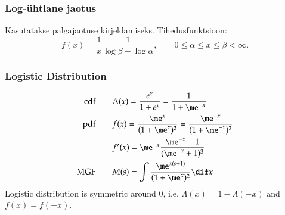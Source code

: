 \documentclass[a4paper]{article}
\numberwithin{equation}{subsection}
\begin{document}
\subsubsection{Log-ühtlane jaotus}
Kasutatakse palgajaotuse kirjeldamiseks.  Tihedusfunktsioon:
\begin{equation}
  f(x) = \frac{1}{x}\frac{1}{\log \beta - \log \alpha}, \qquad
  0 \le \alpha \le x \le \beta < \infty.
\end{equation}

\subsubsection{Logistic Distribution}
\begin{align}
  \text{cdf}\qquad & \Lambda(x) = \frac{e^x}{1+e^x} = \frac{1}{1 + \me^{-x}}
  \\
  \text{pdf}\qquad & f(x) = \frac{\me^x}{(1 + \me^x)^2} = \frac{\me^{-x}}
  {(1 + \me^{-x})^2}
  \\
  & f'(x) = \me^{-x} \frac{\me^{-x} - 1}{(\me^{-x} + 1)^3}
  \\
  \text{MGF}\qquad &
  M(s) = \int \frac{\me^{x(s+1)}}{(1 + \me^x)^2} \dif x
\end{align}
Logistic distribution is symmetric around 0, i.e. $\Lambda(x) = 1 -
\Lambda(-x)$ and $f(x) = f(-x)$.
\end{document}
